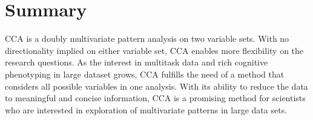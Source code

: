 \section{Summary}
\label{ch:methods:summary}
CCA is a doubly multivariate pattern analysis on two variable sets. With no directionality implied on either variable set, CCA enables more flexibility on the research questions. As the interest in multitask data and rich cognitive phenotyping in large dataset grows, CCA fulfills the need of a method that considers all possible variables in one analysis. With its ability to reduce the data to meaningful and concise information, CCA is a promising method for scientists who are interested in exploration of multivariate patterns in large data sets.